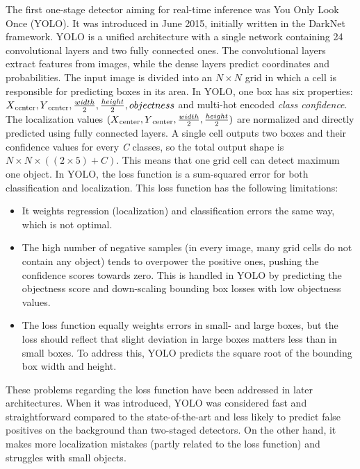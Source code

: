 The first one-stage detector aiming for real-time inference was You Only Look Once\cite{YOLO} (YOLO). It was introduced in June 2015, initially written in the DarkNet framework. YOLO is a unified architecture with a single network containing 24 convolutional layers and two fully connected ones. The convolutional layers extract features from images, while the dense layers predict coordinates and probabilities. The input image is divided into an \(N \times N\) grid in which a cell is responsible for predicting boxes in its area. In YOLO, one box has six properties: \(X\textsubscript{center}, Y\textsubscript{center}, \frac{width}{2}, \frac{height}{2}, objectness\) and multi-hot encoded \textit{class confidence}. The localization values \((X\textsubscript{center}, Y\textsubscript{center}, \frac{width}{2}, \frac{height}{2})\) are normalized and directly predicted using fully connected layers. A single cell outputs two boxes and their confidence values for every \textit{C} classes, so the total output shape is \(N \times N \times ((2 \times 5)+C)\). This means that one grid cell can detect maximum one object. In YOLO, the loss function is a sum-squared error for both classification and localization. This loss function has the following limitations:

\begin{itemize}
  \item It weights regression (localization) and classification errors the same way, which is not optimal.
  \item The high number of negative samples (in every image, many grid cells do not contain any object) tends to overpower the positive ones, pushing the confidence scores towards zero. This is handled in YOLO by predicting the objectness score and down-scaling bounding box losses with low objectness values.
  \item The loss function equally weights errors in small- and large boxes, but the loss should reflect that slight deviation in large boxes matters less than in small boxes. To address this, YOLO predicts the square root of the bounding box width and height.
\end{itemize}

These problems regarding the loss function have been addressed in later architectures. When it was introduced, YOLO was considered fast and straightforward compared to the state-of-the-art and less likely to predict false positives on the background than two-staged detectors. On the other hand, it makes more localization mistakes (partly related to the loss function) and struggles with small objects.

